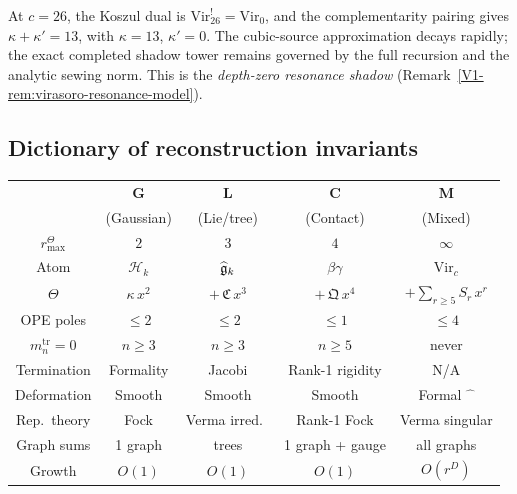 \begin{remark}
At $c = 26$, the Koszul dual is
$\mathrm{Vir}_{26}^! = \mathrm{Vir}_0$, and the
complementarity pairing gives
$\kappa + \kappa' = 13$, with $\kappa = 13$, $\kappa' = 0$.
The cubic-source approximation decays rapidly; the exact completed
shadow tower remains governed by the full recursion and the analytic
sewing norm. This is the \emph{depth-zero resonance shadow}
(Remark~\ref{V1-rem:virasoro-resonance-model}).
\end{remark}


\subsection{Dictionary of reconstruction invariants}

\begin{center}
\renewcommand{\arraystretch}{1.5}
\small
\begin{tabular}{ccccc}
\toprule
& \textbf{G} & \textbf{L} & \textbf{C} & \textbf{M} \\
& (Gaussian) & (Lie/tree) & (Contact) & (Mixed) \\
\midrule
$r^\Theta_{\max}$ & $2$ & $3$ & $4$ & $\infty$ \\
Atom & $\mathcal{H}_k$ & $\widehat{\mathfrak{g}}_k$
 & $\beta\gamma$ & $\mathrm{Vir}_c$ \\
$\Theta$ & $\kappa\,x^2$ & $+\,\mathfrak{C}\,x^3$
 & $+\,\mathfrak{Q}\,x^4$ & $+\sum_{r \geq 5} S_r\,x^r$ \\
\midrule
OPE poles & $\leq 2$ & $\leq 2$ & $\leq 1$ & $\leq 4$ \\
$m_n^{\mathrm{tr}} = 0$ & $n \geq 3$ & $n \geq 3$
 & $n \geq 5$ & never \\
Termination & Formality & Jacobi & Rank-1 rigidity
 & N/A \\
\midrule
Deformation & Smooth & Smooth & Smooth & Formal $\widehat{\phantom{x}}$ \\
Rep.\ theory & Fock & Verma irred.\ & Rank-1 Fock
 & Verma singular \\
Graph sums & 1 graph & trees & 1 graph + gauge
 & all graphs \\
Growth & $O(1)$ & $O(1)$ & $O(1)$
 & $O(r^D)$ \\
\bottomrule
\end{tabular}
\end{center}

